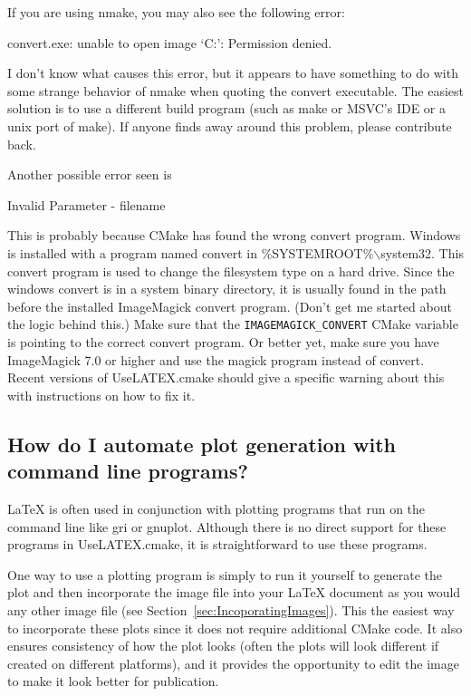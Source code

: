 \documentclass{article}
\newcommand*{\textfile}[1]{\textsf{#1}}
\newcommand*{\textprog}[1]{\textfile{#1}}
\newcommand*{\textcmake}[1]{\texttt{#1}}
\newcommand*{\textcmakevar}[1]{\textcmake{#1}}
\newcommand*{\UseLATEX}{\textfile{UseLATEX.cmake}\xspace}
\newcommand*{\latex}{\LaTeX\xspace}
\begin{document}
  If you are using nmake, you may also see the following error:

  \begin{CodeListing}
convert.exe: unable to open image `C:': Permission denied.
  \end{CodeListing}

  I don't know what causes this error, but it appears to have something to
  do with some strange behavior of nmake when quoting the convert
  executable. The easiest solution is to use a different build program
  (such as make or MSVC's IDE or a unix port of make). If anyone finds away
  around this problem, please contribute back.

  Another possible error seen is

  \begin{CodeListing}
Invalid Parameter - filename
  \end{CodeListing}

  This is probably because CMake has found the wrong \textprog{convert} program.
  Windows is installed with a program named \textprog{convert} in \textfile{\%SYSTEMROOT\%$\backslash$system32}.
  This \textprog{convert} program is used to change the filesystem type on a hard drive.
  Since the windows \textfile{convert} is in a system binary directory, it is usually found in the path before the installed ImageMagick \textfile{convert} program.
  (Don't get me started about the logic behind this.)
  Make sure that the \textcmakevar{IMAGEMAGICK\_CONVERT} CMake variable is pointing to the correct \textprog{convert} program.
  Or better yet, make sure you have ImageMagick 7.0 or higher and use the \textprog{magick} program instead of \textprog{convert}.
  Recent versions of \UseLATEX should give a specific warning about this with instructions on how to fix it.

  \subsection{How do I automate plot generation with command line programs?}
  \label{How_do_I_automate_plot_generation_with_command_line_programs}

  \latex is often used in conjunction with plotting programs that run on
  the command line like \textprog{gri} or \textprog{gnuplot}.  Although
  there is no direct support for these programs in \UseLATEX, it is
  straightforward to use these programs.

  One way to use a plotting program is simply to run it yourself to
  generate the plot and then incorporate the image file into your \latex
  document as you would any other image file (see
  Section~\ref{sec:IncoporatingImages}).  This the easiest way to
  incorporate these plots since it does not require additional CMake code.
  It also ensures consistency of how the plot looks (often the plots will
  look different if created on different platforms), and it provides the
  opportunity to edit the image to make it look better for publication.
\end{document}

